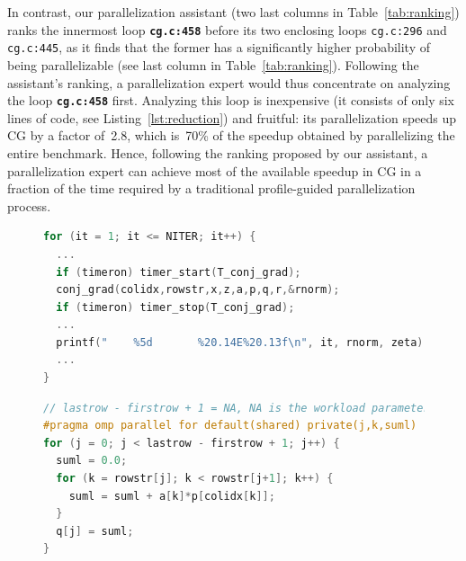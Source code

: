 In contrast, our parallelization assistant (two last columns in
Table~\ref{tab:ranking}) ranks the innermost loop \textbf{\texttt{cg.c:458}} before its two enclosing loops \texttt{cg.c:296} and \texttt{cg.c:445}, as it finds that the former has a
significantly higher probability of being parallelizable (see last column in
Table~\ref{tab:ranking}).
%
Following the assistant's ranking, a parallelization expert would thus
concentrate on analyzing the loop \textbf{\texttt{cg.c:458}} first.
%
Analyzing this loop is inexpensive (it consists of only six lines of code, see
Listing~\ref{lst:reduction}) and fruitful: its parallelization speeds up CG by a
factor of~2.8, which is~70\% of the speedup obtained by parallelizing the entire
benchmark.
%
Hence, following the ranking proposed by our assistant, a parallelization expert
can achieve most of the available speedup in CG in a fraction of the time
required by a traditional profile-guided parallelization process.

\begin{figure}[t]
\begin{lstlisting}[caption={\texttt{cg.c:296}. The longest running loop in CG. The loop cannot be parallelized due to
inter-iteration dependences and side effects caused by system calls.},label={lst:main_iter},language=C]
for (it = 1; it <= NITER; it++) {
  ...
  if (timeron) timer_start(T_conj_grad);
  conj_grad(colidx,rowstr,x,z,a,p,q,r,&rnorm);
  if (timeron) timer_stop(T_conj_grad);
  ...
  printf("    %5d       %20.14E%20.13f\n", it, rnorm, zeta);
  ...
}
\end{lstlisting}
\begin{lstlisting}[caption={\textbf{\texttt{cg.c:458}}. Longest running loop in CG among those \emph{that can be parallelized}. Parallelization pragmas are also added to demonstrate its parallelization.},label={lst:reduction},language=C]
// lastrow - firstrow + 1 = NA, NA is the workload parameter (S=1400,M=7000,L=140000,...)
#pragma omp parallel for default(shared) private(j,k,suml)
for (j = 0; j < lastrow - firstrow + 1; j++) {
  suml = 0.0;
  for (k = rowstr[j]; k < rowstr[j+1]; k++) {
    suml = suml + a[k]*p[colidx[k]];
  }
  q[j] = suml;
}
\end{lstlisting}
\end{figure}

